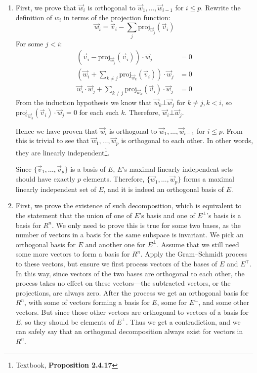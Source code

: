 \documentclass{article}
\begin{document}
\maketitle

\begin{enumerate}[1.]
\item
First, we prove that $\vec{w}_i$ is orthogonal to $\vec{w}_1, \hdots, 
\vec{w}_{i-1}$ for $i \leq p$. Rewrite the definition of $w_i$ in terms of
the projection function:
\newcommand \ProjW[1]{\mathrm{proj}_{\vec{w}_{#1}}(\vec{v}_i)}
$$\vec{w}_i = \vec{v}_i - \sum_j\ProjW{j}$$
For some $j < i$:
$$
\begin{aligned}
(\vec{v}_i - \ProjW{j}) \cdot \vec{w}_j &= 0 \\
(\vec{w}_i + \sum_{k \neq j}\ProjW{k}) \cdot \vec{w}_j &= 0 \\
\vec{w}_i \cdot \vec{w}_j + \sum_{k \neq j} \ProjW{k} \cdot \vec{w}_j &= 0
\end{aligned}
$$
From the induction hypothesis we know that $\vec{w}_k \bot \vec{w}_j$ for
$k \neq j, k < i$, so $\ProjW{k} \cdot \vec{w}_j = 0$ for each such $k$.
Therefore, $\vec{w}_i \bot \vec{w}_j$.

Hence we have proven that $\vec{w}_i$ is orthogonal to $\vec{w}_1, \hdots,
\vec{w}_{i-1}$ for $i \leq p$. From this is trivial to see that $\vec{w}_1,
\hdots, \vec{w}_p$ is orthogonal to each other. In other words, they are
linearly independent\footnote{Textbook, \textbf{Proposition 2.4.17}}.

Since $\{\vec{v}_1, \hdots, \vec{v}_p\}$ is a basis of $E$, $E$'s maximal
linearly independent sets should have exactly $p$ elements. Therefore,
$\{\vec{w}_1, \hdots, \vec{w}_p\}$ forms a maximal linearly independent set of
$E$, and it is indeed an orthogonal basis of $E$. \rQED

\item
First, we prove the existence of such decomposition, which is equivalent to the statement that the union of one of  $E$'s basis and one of $E^{\bot}$'s basis is a basis for $R^n$. We only need to prove this is true for some two bases, as the number of vectors in a basis for the same subspace is invariant. We pick an orthogonal basis for $E$ and another one for $E^{\bot}$. Assume that we still need some more vectors to form a basis for $R^n$. Apply the Gram--Schmidt process to these vectors, but ensure we first process vectors of the bases of $E$ and $E^{\top}$. In this way, since vectors of the two bases are orthogonal to each other, the process takes no effect on these vectors---the subtracted vectors, or the projections, are always zero. After the process we get an orthogonal basis for $R^n$, with some of vectors forming a basis for $E$, some for $E^{\bot}$, and some other vectors. But since those other vectors are orthogonal to vectors of a basis for $E$, so they should be elements of $E^{\bot}$. Thus we get a contradiction, and we can safely say that an orthogonal decomposition always exist for vectors in $R^n$.


\end{enumerate}
\end{document}
